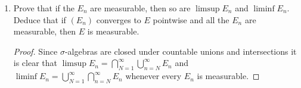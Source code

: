 \documentclass[11pt]{article}
\newcommand{\cbr}[1]{\left\{#1\right\}}
\begin{document}
\begin{enumerate}
\begin{enumerate}
\begin{proof}
            Similarly, for $x\in X$, the quantity $\liminf \mathbf{1}_{E_n}(x)= \lim (\inf\cbr{\mathbf{1}_{E_k}(x)\mid k\geq n})$. This limit is $1$ if and only if there exists an $N\geq 1$ such that for $n\geq N$, $x\in E_j$ for every $j\geq n$. This is exactly the condition needed for $x$ to be in $\liminf E_n = \bigcup_{N=1}^\infty\bigcap_{n=N}^\infty E_n$; that is, there exists $N\geq 1$ such that for every $n\geq N$, $x\in E_n$. Hence $\liminf \mathbf{1}_{E_n} = \mathbf{1}_{\liminf E_n}$.

            The sequence $(E_n)$ converges to $E$ pointwise if and only if for every $x\in X$, the sequence $(\mathbf{1}_{E_n}(x))$ converges to $\mathbf{1}_E(x)$. This is equivalent to saying $\limsup \mathbf{1}_{E_n}(x) = \liminf \mathbf{1}_{E_n}(x) = \mathbf{1}_E(x)$. By the above two results we equivalently have that $\mathbf{1}_{\limsup E_n}(x) = \mathbf{1}_{\liminf E_n}(x) = \mathbf{1}_E(x)$, which is equivalent to $\limsup E_n = \liminf E_n = E$ as desired.
        \end{proof}
        \item Prove that if the $E_n$ are measurable, then so are $\limsup E_n$ and $\liminf E_n$. Deduce that if $(E_n)$ converges to $E$ pointwise and all the $E_n$ are measurable, then $E$ is measurable. \begin{proof}
            Since $\sigma$-algebras are closed under countable unions and intersections it is clear that $\limsup E_n = \bigcap_{N=1}^\infty \bigcup_{n=N}^\infty E_n$ and $\liminf E_n = \bigcup_{N=1}^\infty\bigcap_{n=N}^\infty E_n$ whenever every $E_n$ is measurable.


\end{proof}
\end{enumerate}
\end{enumerate}
\end{document}
